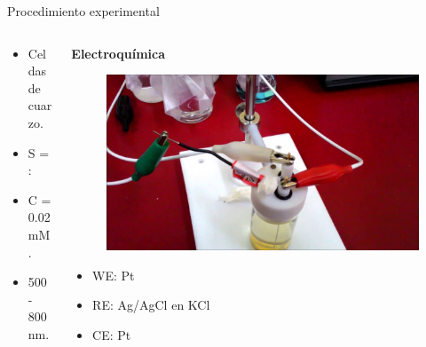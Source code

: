 \documentclass[handout]{beamer}
\begin{document}
\begin{frame}{Procedimiento experimental}
\begin{columns}
\begin{column}{0.25\linewidth}
\begin{figure}[h]
			\end{figure}
			\tiny
			\begin{itemize}
				\item Celdas de cuarzo.
				\item S =  : 
				\item C = 0.02 mM.
				\item 500 - 800 nm.
			\end{itemize}
		\end{column}
		\begin{column}{0.2\linewidth}
			\textbf{Electroqu\'imica}
			\begin{figure}[h]
				\centering
				\includegraphics[width=\textwidth]{sources/electrical}
			\end{figure}
			\tiny
			\begin{itemize}
				\item WE: Pt
				\item RE: Ag/AgCl en KCl
				\item CE: Pt
			\end{itemize}
		\end{column}
	\end{columns}
	\vspace{1cm}
\end{frame}
\end{document}
